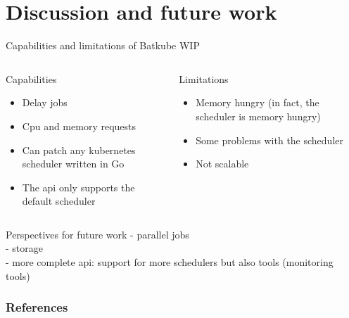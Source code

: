 \documentclass[12pt, aspectratio=43]{beamer}
\begin{document}
\section{Discussion and future work}
\begin{frame}{Capabilities and limitations of Batkube}
	WIP
	\begin{columns}
		\begin{block}{Capabilities}
			\begin{itemize}
				\item Delay jobs
				\item Cpu and memory requests
				\item Can patch any kubernetes scheduler written in Go
				\item The api only supports the default scheduler
			\end{itemize}
		\end{block}

		\begin{alertblock}{Limitations}
			\begin{itemize}
				\item Memory hungry (in fact, the scheduler is memory hungry)
				\item Some problems with the scheduler
				\item Not scalable
			\end{itemize}
		\end{alertblock}
	\end{columns}
\end{frame}

\begin{frame}{Perspectives for future work}
	- parallel jobs\\
	- storage\\
	- more complete api: support for more schedulers but also tools (monitoring tools)
\end{frame}

\begin{frame}[allowframebreaks]
        \frametitle{References}
	\printbibliography
\end{frame}
\end{document}
